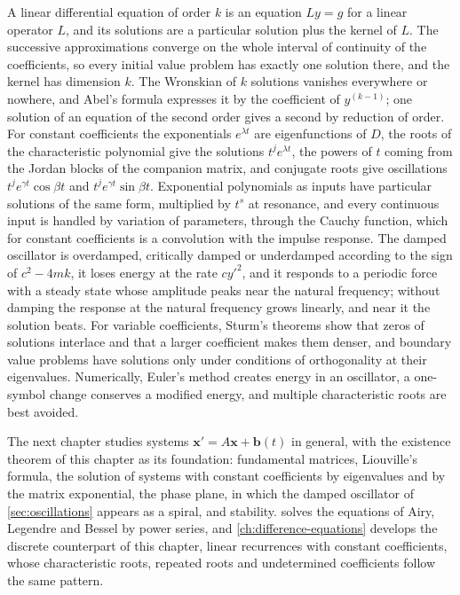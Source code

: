 \bigskip
A linear differential equation of order $k$ is an equation $Ly=g$ for a linear operator $L$, and its solutions are a particular solution plus the kernel of $L$. The successive approximations converge on the whole interval of continuity of the coefficients, so every initial value problem has exactly one solution there, and the kernel has dimension $k$. The Wronskian of $k$ solutions vanishes everywhere or nowhere, and Abel's formula expresses it by the coefficient of $y^{(k-1)}$; one solution of an equation of the second order gives a second by reduction of order. For constant coefficients the exponentials $e^{\lambda t}$ are eigenfunctions of $D$, the roots of the characteristic polynomial give the solutions $t^je^{\lambda t}$, the powers of $t$ coming from the Jordan blocks of the companion matrix, and conjugate roots give oscillations $t^je^{\gamma t}\cos\beta t$ and $t^je^{\gamma t}\sin\beta t$. Exponential polynomials as inputs have particular solutions of the same form, multiplied by $t^s$ at resonance, and every continuous input is handled by variation of parameters, through the Cauchy function, which for constant coefficients is a convolution with the impulse response. The damped oscillator is overdamped, critically damped or underdamped according to the sign of $c^2-4mk$, it loses energy at the rate $cy'^2$, and it responds to a periodic force with a steady state whose amplitude peaks near the natural frequency; without damping the response at the natural frequency grows linearly, and near it the solution beats. For variable coefficients, Sturm's theorems show that zeros of solutions interlace and that a larger coefficient makes them denser, and boundary value problems have solutions only under conditions of orthogonality at their eigenvalues. Numerically, Euler's method creates energy in an oscillator, a one-symbol change conserves a modified energy, and multiple characteristic roots are best avoided.

The next chapter studies systems $\mathbf x'=A\mathbf x+\mathbf b(t)$ in general, with the existence theorem of this chapter as its foundation: fundamental matrices, Liouville's formula, the solution of systems with constant coefficients by eigenvalues and by the matrix exponential, the phase plane, in which the damped oscillator of \cref{sec:oscillations} appears as a spiral, and stability.  solves the equations of Airy, Legendre and Bessel by power series, and \cref{ch:difference-equations} develops the discrete counterpart of this chapter, linear recurrences with constant coefficients, whose characteristic roots, repeated roots and undetermined coefficients follow the same pattern.

